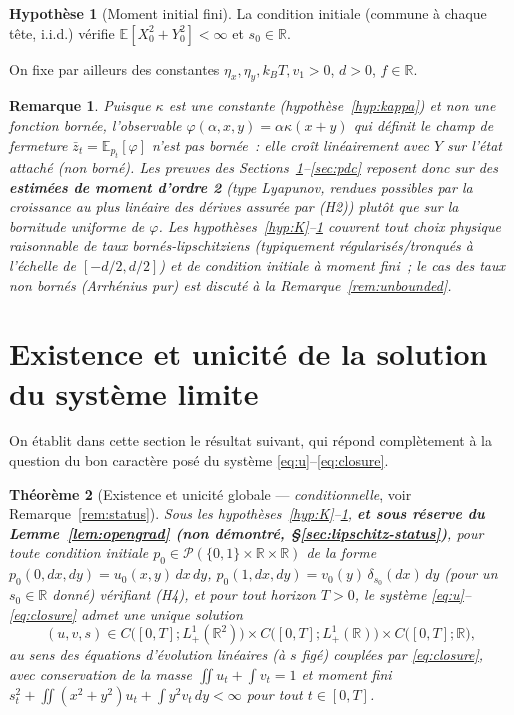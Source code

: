 \documentclass[11pt,a4paper]{article}
\newcommand{\E}{\mathbb{E}}
\newcommand{\R}{\mathbb{R}}
\theoremstyle{plain}
\newtheorem*{remark*}{Remarque}
\newtheorem{thm}{Théorème}[section]
\theoremstyle{definition}
\newtheorem{hyp}[thm]{Hypothèse}
\begin{document}
\begin{hyp}[Moment initial fini]
\label{hyp:moment}
La condition initiale (commune \`a chaque t\^ete, i.i.d.) v\'erifie $\E[X_0^2+Y_0^2]<\infty$ et $s_0\in\R$.
\end{hyp}

On fixe par ailleurs des constantes $\eta_x,\eta_y,k_BT,v_1>0$, $d>0$, $f\in\R$.

\begin{remark*}
Puisque $\kappa$ est une constante (hypoth\`ese~\ref{hyp:kappa}) et non une fonction born\'ee, l'observable $\varphi(\alpha,x,y)=\alpha\kappa(x+y)$ qui d\'efinit le champ de fermeture $\bar z_t=\E_{p_t}[\varphi]$ n'est pas born\'ee~: elle cro\^it lin\'eairement avec $Y$ sur l'\'etat attach\'e (non born\'e). Les preuves des Sections~\ref{sec:existence}--\ref{sec:pdc} reposent donc sur des \textbf{estim\'ees de moment d'ordre 2} (type Lyapunov, rendues possibles par la croissance au plus lin\'eaire des d\'erives assur\'ee par (H2)) plut\^ot que sur la bornitude uniforme de $\varphi$. Les hypoth\`eses~\ref{hyp:K}--\ref{hyp:moment} couvrent tout choix physique raisonnable de taux born\'es-lipschitziens (typiquement r\'egularis\'es/tronqu\'es \`a l'\'echelle de $[-d/2,d/2]$) et de condition initiale \`a moment fini~; le cas des taux non born\'es (Arrh\'enius pur) est discut\'e \`a la Remarque~\ref{rem:unbounded}.
\end{remark*}

\section{Existence et unicit\'e de la solution du syst\`eme limite}
\label{sec:existence}

On \'etablit dans cette section le r\'esultat suivant, qui r\'epond compl\`etement \`a la question du bon caract\`ere pos\'e du syst\`eme \eqref{eq:u}--\eqref{eq:closure}.

\begin{thm}[Existence et unicit\'e globale --- \emph{conditionnelle}, voir Remarque~\ref{rem:status}]
\label{thm:existence}
Sous les hypoth\`eses~\ref{hyp:K}--\ref{hyp:moment}, \textbf{et sous r\'eserve du Lemme~\ref{lem:opengrad} (non d\'emontr\'e, \S\ref{sec:lipschitz-status})}, pour toute condition initiale $p_0\in\mathcal P(\{0,1\}\times\R\times\R)$ de la forme $p_0(0,dx,dy)=u_0(x,y)\,dx\,dy$, $p_0(1,dx,dy)=v_0(y)\,\delta_{s_0}(dx)\,dy$ (pour un $s_0\in\R$ donn\'e) v\'erifiant (H4), et pour tout horizon $T>0$, le syst\`eme \eqref{eq:u}--\eqref{eq:closure} admet une unique solution
\[
(u,v,s)\in C\big([0,T];L^1_+(\R^2)\big)\times C\big([0,T];L^1_+(\R)\big)\times C\big([0,T];\R\big),
\]
au sens des \'equations d'\'evolution lin\'eaires (\`a $s$ fig\'e) coupl\'ees par \eqref{eq:closure}, avec conservation de la masse $\iint u_t+\int v_t=1$ et moment fini $s_t^2+\iint(x^2+y^2)u_t+\int y^2v_t\,dy<\infty$ pour tout $t\in[0,T]$.
\end{thm}
\end{document}
